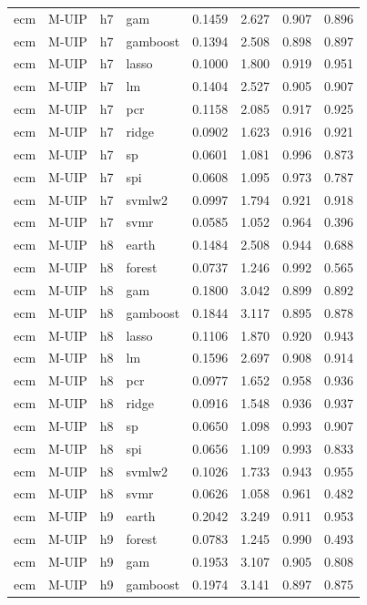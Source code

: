\begin{ThreePartTable}
\begin{longtable}[t]{llclcccc}
ecm & M-UIP & h7 & gam & 0.1459 & 2.627 & 0.907 & 0.896\\
ecm & M-UIP & h7 & gamboost & 0.1394 & 2.508 & 0.898 & 0.897\\
ecm & M-UIP & h7 & lasso & 0.1000 & 1.800 & 0.919 & 0.951\\
ecm & M-UIP & h7 & lm & 0.1404 & 2.527 & 0.905 & 0.907\\
ecm & M-UIP & h7 & pcr & 0.1158 & 2.085 & 0.917 & 0.925\\
ecm & M-UIP & h7 & ridge & 0.0902 & 1.623 & 0.916 & 0.921\\
ecm & M-UIP & h7 & sp & 0.0601 & 1.081 & 0.996 & 0.873\\
ecm & M-UIP & h7 & spi & 0.0608 & 1.095 & 0.973 & 0.787\\
ecm & M-UIP & h7 & svmlw2 & 0.0997 & 1.794 & 0.921 & 0.918\\
ecm & M-UIP & h7 & svmr & 0.0585 & 1.052 & 0.964 & 0.396\\
\addlinespace
ecm & M-UIP & h8 & earth & 0.1484 & 2.508 & 0.944 & 0.688\\
ecm & M-UIP & h8 & forest & 0.0737 & 1.246 & 0.992 & 0.565\\
ecm & M-UIP & h8 & gam & 0.1800 & 3.042 & 0.899 & 0.892\\
ecm & M-UIP & h8 & gamboost & 0.1844 & 3.117 & 0.895 & 0.878\\
ecm & M-UIP & h8 & lasso & 0.1106 & 1.870 & 0.920 & 0.943\\
ecm & M-UIP & h8 & lm & 0.1596 & 2.697 & 0.908 & 0.914\\
ecm & M-UIP & h8 & pcr & 0.0977 & 1.652 & 0.958 & 0.936\\
ecm & M-UIP & h8 & ridge & 0.0916 & 1.548 & 0.936 & 0.937\\
ecm & M-UIP & h8 & sp & 0.0650 & 1.098 & 0.993 & 0.907\\
ecm & M-UIP & h8 & spi & 0.0656 & 1.109 & 0.993 & 0.833\\
ecm & M-UIP & h8 & svmlw2 & 0.1026 & 1.733 & 0.943 & 0.955\\
ecm & M-UIP & h8 & svmr & 0.0626 & 1.058 & 0.961 & 0.482\\
\addlinespace
ecm & M-UIP & h9 & earth & 0.2042 & 3.249 & 0.911 & 0.953\\
ecm & M-UIP & h9 & forest & 0.0783 & 1.245 & 0.990 & 0.493\\
ecm & M-UIP & h9 & gam & 0.1953 & 3.107 & 0.905 & 0.808\\
ecm & M-UIP & h9 & gamboost & 0.1974 & 3.141 & 0.897 & 0.875\\

\end{longtable}
\end{ThreePartTable}
